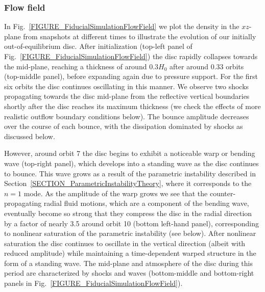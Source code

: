 \documentclass[fleqn,usenatbib]{mnras}
\begin{document}
\subsubsection{Flow field}
In Fig.~\ref{FIGURE_FiducialSimulationFlowField} we plot the density in the $xz$-plane from snapshots at different times to illustrate the evolution of our initially out-of-equilibrium disc. After initialization (top-left panel of Fig.~\ref{FIGURE_FiducialSimulationFlowField}) the disc rapidly collapses towards the mid-plane, reaching a thickness of around $0.3H_0$ after around 0.33 orbits (top-middle panel), before expanding again due to pressure support. For the first six orbits the disc continues oscillating in this manner. We observe two shocks propagating towards the disc mid-plane from the reflective vertical boundaries shortly after the disc reaches its maximum thickness (we check the effects of more realistic outflow boundary conditions below). The bounce amplitude decreases over the course of each bounce, with the dissipation dominated by shocks as discussed below. 

However, around orbit 7 the disc begins to exhibit a noticeable warp or bending wave (top-right panel), which develops into a standing wave as the disc continues to bounce. This wave grows as a result of the parametric instability described in Section~\ref{SECTION_ParametricInstabilityTheory}, where it corresponds to the $n=1$ mode. As the amplitude of the warp grows we see that the counter-propagating radial fluid motions, which are a component of the bending wave, eventually become so strong that they compress the disc in the radial direction by a factor of nearly 3.5 around orbit 10 (bottom left-hand panel), corresponding to nonlinear saturation of the parametric instability (see below). After nonlinear saturation the disc continues to oscillate in the vertical direction (albeit with reduced amplitude) while maintaining a time-dependent warped structure in the form of a standing wave. The mid-plane and atmosphere of the disc during this period are characterized by shocks and waves (bottom-middle and bottom-right panels in Fig.~\ref{FIGURE_FiducialSimulationFlowField}).
\end{document}
